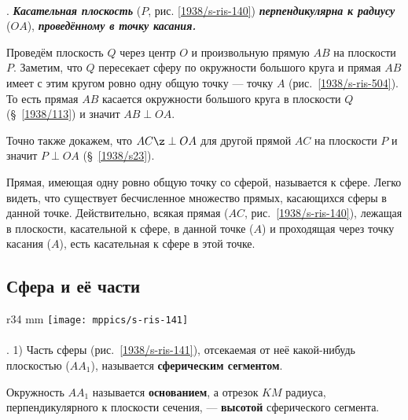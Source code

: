 \paragraph{}\label{1938/s133}
\mbox{.}
\textbf{\emph{Касательная плоскость}} ($P$, рис. \ref{1938/s-ris-140}) \textbf{\emph{перпендикулярна к радиусу}} ($OA$), \textbf{\emph{проведённому в точку касания.}}

Проведём плоскость $Q$ через центр $O$ и произвольную прямую $AB$ на плоскости~$P$.
Заметим, что $Q$ пересекает сферу по окружности большого круга и прямая $AB$ имеет с этим кругом ровно одну общую точку — точку $A$ (рис.~\ref{1938/s-ris-504}).
То есть прямая $AB$ касается окружности большого круга в плоскости $Q$ (§~\ref{1938/113}) и значит $AB\perp OA$.

Точно также докажем, что $AC\z\perp OA$ для другой прямой $AC$ на плоскости $P$
и значит $P\perp OA$ (§~\ref{1938/s23}).

Прямая, имеющая одну ровно общую точку со сферой, называется  к сфере.
Легко видеть, что существует бесчисленное множество прямых, касающихся сферы в данной точке.
Действительно, всякая прямая ($AC$, рис.~\ref{1938/s-ris-140}), лежащая в плоскости, касательной к сфере, в данной точке ($A$) и проходящая через точку касания ($A$), есть касательная к сфере в этой точке.

\subsection*{Сфера и её части} 

\begin{wrapfigure}{r}{34 mm}
\vskip-6mm
\centering
\texttt{[image: mppics/s-ris-141]}
\caption{}\label{1938/s-ris-141}
\vskip-0mm
\end{wrapfigure}

\paragraph{}\label{1938/s134}
\mbox{.}
1) Часть сферы (рис.~\ref{1938/s-ris-141}), отсекаемая от неё какой-нибудь плоскостью ($AA_1$), называется \textbf{сферическим сегментом}.

Окружность $AA_1$ называется \textbf{основанием}, а отрезок $KM$ радиуса, перпендикулярного к плоскости сечения, — \textbf{высотой} сферического сегмента.

